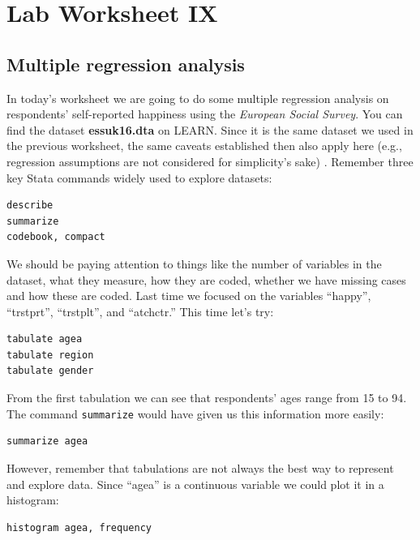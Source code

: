 \documentclass{article}
\begin{document}
\pagestyle{fancy}
\fancyhf{}

\section*{\hfil Lab Worksheet IX \hfil}
\subsection*{Multiple regression analysis}

In today's worksheet we are going to do some multiple regression analysis on respondents' self-reported happiness using the \textit{European Social Survey}. You can find the dataset \textbf{essuk16.dta} on LEARN. Since it is the same dataset we used in the previous worksheet, the same caveats established then also apply here (e.g., regression assumptions are not considered for simplicity's sake) . Remember three key Stata commands widely used to explore datasets:

\begin{lstlisting}
describe
summarize
codebook, compact
\end{lstlisting}

We should be paying attention to things like the number of variables in the dataset, what they measure, how they are coded, whether we have missing cases and how these are coded. Last time we focused on the variables ``happy'', ``trstprt'', ``trstplt'', and ``atchctr.'' This time let's try:

\begin{lstlisting}
tabulate agea
tabulate region
tabulate gender
\end{lstlisting}

From the first tabulation we can see that respondents' ages range from 15 to 94. The command \texttt{summarize} would have given us this information more easily:

\begin{lstlisting}
summarize agea
\end{lstlisting}

However, remember that tabulations are not always the best way to represent and explore data. Since ``agea'' is a continuous variable we could plot it in a histogram:

\begin{lstlisting}
histogram agea, frequency
\end{lstlisting}
\end{document}
